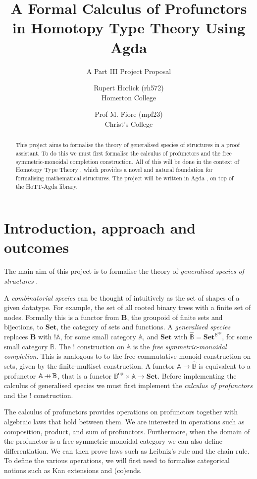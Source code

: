 \documentclass[12pt, parskip]{scrartcl}
\title{A Formal Calculus of Profunctors in Homotopy Type Theory Using Agda}
\subtitle{A Part III Project Proposal}
\date{}
\author{Rupert Horlick (rh572) \\
  \large Homerton College \\
  \and
  Prof M. Fiore (mpf23) \\
  \large Christ's College}
\DeclareMathOperator\prof{\ooalign{\hss$\Mapsfromchar$\hss\cr$\to$}}
\begin{document}
\maketitle

\begin{abstract}
  This project aims to formalise the theory of generalised species of structures \cite{fiore2008cartesian} in a proof assistant. To do this we must first formalise the calculus of profunctors and the free symmetric-monoidal completion construction. All of this will be done in the context of Homotopy Type Theory \cite{hottbook}, which provides a novel and natural foundation for formalising mathematical structures. The project will be written in Agda \cite{norell2007towards}, on top of the HoTT-Agda \cite{hottagda} library.
\end{abstract}

\section{Introduction, approach and outcomes}

The main aim of this project is to formalise the theory of \emph{generalised species of structures} \cite{fiore2008cartesian}.

A \emph{combinatorial species} \cite{joyal1986foncteurs} can be thought of intuitively as the set of shapes of a given datatype. For example, the set of all rooted binary trees with a finite set of nodes. Formally this is a functor from $\mathbf{B}$, the groupoid of finite sets and bijections, to $\mathbf{Set}$, the category of sets and functions. A \emph{generalised species} replaces $\mathbf{B}$ with $!\mathbb{A}$, for some small category $\mathbb{A}$, and $\mathbf{Set}$ with $\widehat{\mathbb{B}} = \mathbf{Set}^{\mathbb{B}^{\mathrm{op}}}$, for some small category $\mathbb{B}$. The $!$ construction on $\mathbb{A}$ is the \emph{free symmetric-monoidal completion}. This is analogous to to the free commutative-monoid construction on sets, given by the finite-multiset construction. A functor $\mathbb{A} \to \widehat{\mathbb{B}}$ is equivalent to a profunctor \cite{benabou1973distributeurs} $\mathbb{A} \prof \mathbb{B}$, that is a functor $\mathbb{B}^{\mathrm{op}} \times \mathbb{A} \to \mathbf{Set}$. Before implementing the calculus of generalised species we must first implement the \emph{calculus of profunctors} and the $!$ construction.

The calculus of profunctors provides operations on profunctors together with algebraic laws that hold between them. We are interested in operations such as composition, product, and sum of profunctors. Furthermore, when the domain of the profunctor is a free symmetric-monoidal category we can also define differentiation. We can then prove laws such as Leibniz's rule and the chain rule. To define the various operations, we will first need to formalise categorical notions such as Kan extensions and (co)ends.
\end{document}
